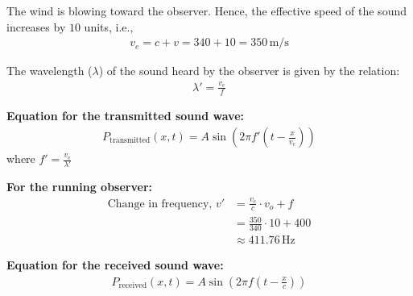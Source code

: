 \documentclass[twocolumn]{article}
\begin{document}
The wind is blowing toward the observer. Hence, the effective speed of the sound increases by $10$ units, i.e.,
\begin{align}
    v_e = c + v = 340 + 10 = 350 \, \text{m/s}
\end{align}

The wavelength ($\lambda$) of the sound heard by the observer is given by the relation:
\begin{align}
    \lambda' = \frac{v_e}{f}
\end{align}

\textbf{Equation for the transmitted sound wave:}
\begin{align}
    P_{\text{transmitted}}(x, t) = A \sin\left(2\pi f'\left(t - \frac{x}{v_e}\right)\right)
\end{align}
where $f' = \frac{v_e}{\lambda'}$

\textbf{For the running observer:}
\begin{align}
    \text{Change in frequency, } v' &= \frac{v_e}{c} \cdot v_o + f \\
    &= \frac{350}{340} \cdot 10 + 400 \\
    &\approx 411.76 \, \text{Hz}
\end{align}

\textbf{Equation for the received sound wave:}
\begin{align}
    P_{\text{received}}(x, t) = A \sin\left(2\pi f\left(t - \frac{x}{c}\right)\right)
\end{align}
\end{document}
